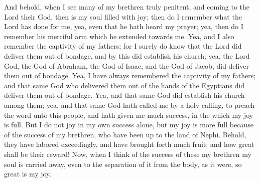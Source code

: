 And behold, when I see many of my brethren truly penitent, and coming to the Lord their God, then is my soul filled with joy; then do I remember what the Lord has done for me, yea, even that he hath heard my prayer; yea, then do I remember his merciful arm which he extended towards me.
\bverse \iffalse Yea, and I also remember the captivity of my fathers; for I surely do know that the Lord did deliver them out of bondage, and by this did establish his church; yea, the Lord God, the God of Abraham, the God of Isaac, and the God of Jacob, did deliver them out of bondage. \fi
Yea, and I also remember the captivity of my fathers; for I surely do know that the Lord did deliver them out of bondage, and by this did establish his church; yea, the Lord God, the God of Abraham, the God of Isaac, and the God of Jacob, did deliver them out of bondage.
\bverse \iffalse Yea, I have always remembered the captivity of my fathers; and that same God who delivered them out of the hands of the Egyptians did deliver them out of bondage. \fi
Yea, I have always remembered the captivity of my fathers; and that same God who delivered them out of the hands of the Egyptians did deliver them out of bondage.
\bverse \iffalse Yea, and that same God did establish his church among them; yea, and that same God hath called me by a holy calling, to preach the word unto this people, and hath given me much success, in the which my joy is full. \fi
Yea, and that same God did establish his church among them; yea, and that same God hath called me by a holy calling, to preach the word unto this people, and hath given me much success, in the which my joy is full.
\bverse \iffalse But I do not joy in my own success alone, but my joy is more full because of the success of my brethren, who have been up to the land of Nephi. \fi
But I do not joy in my own success alone, but my joy is more full because of the success of my brethren, who have been up to the land of Nephi.
\bverse \iffalse Behold, they have labored exceedingly, and have brought forth much fruit; and how great shall be their reward! \fi
Behold, they have labored exceedingly, and have brought forth much fruit; and how great shall be their reward!
\bverse \iffalse Now, when I think of the success of these my brethren my soul is carried away, even to the separation of it from the body, as it were, so great is my joy. \fi
Now, when I think of the success of these my brethren my soul is carried away, even to the separation of it from the body, as it were, so great is my joy.
